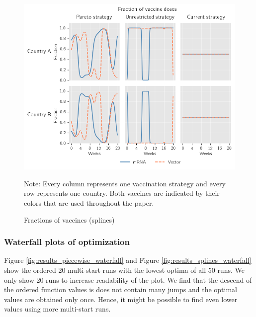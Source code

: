\begin{figure}[h!]
\centering
\includegraphics[scale=0.75]{images/splines_vaccine_fractions.png}\\
\begin{flushleft}
\scriptsize{Note:} Every column represents one vaccination strategy and every row represents one country. Both vaccines are indicated by their colors that are used throughout the paper. 
\end{flushleft}
\caption{Fractions of vaccines (splines)}
\label{fig:results_splines_allocation_fractions}
\end{figure}

\clearpage
\subsubsection{Waterfall plots of optimization}
\label{A:waterfall}

Figure \ref{fig:results_piecewise_waterfall} and Figure \ref{fig:results_splines_waterfall} show the ordered 20 multi-start runs with the lowest optima of all 50 runs. We only show 20 runs to increase readability of the plot. We find that the descend of the ordered function values is does not contain many jumps and the optimal values are obtained only once. Hence, it might be possible to find even lower values using more multi-start runs.



